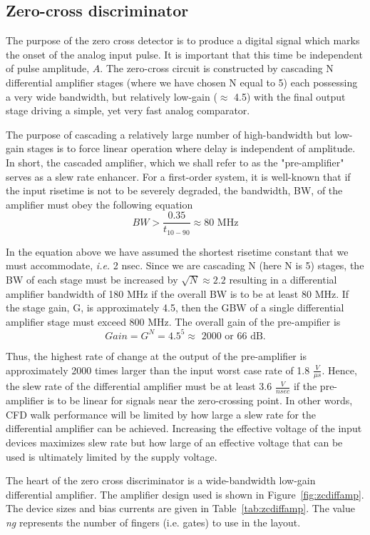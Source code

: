 \documentclass[12pt,oneside,final]{siuethesis}
\theoremstyle{definition}
\begin{document}
\subsection{Zero-cross discriminator}
\par The purpose of the zero cross detector is to produce a digital signal which marks the onset of the analog input pulse. It is important that this time be independent of pulse amplitude, $A$.  The zero-cross circuit is constructed by cascading N differential amplifier stages (where we have chosen N equal to 5) each possessing a very wide bandwidth, but relatively low-gain ($\approx$ 4.5) with the final output stage driving a simple, yet very fast analog comparator.
\par The purpose of cascading a relatively large number of high-bandwidth but low-gain stages is to force linear operation where delay is independent of amplitude. In short, the cascaded amplifier, which we shall refer to as the "pre-amplifier" serves as a slew rate enhancer.  For a first-order system, it is well-known that if the input risetime is not to be severely degraded, the bandwidth, BW, of the amplifier must obey the following equation
\begin{equation}
BW > \frac{0.35}{t_{10-90}} \approx \text{80 MHz}
\end{equation}
\par In the equation above we have assumed the shortest risetime constant that we must accommodate, \emph{i.e.}  2 nsec. Since we are cascading N (here N is 5) stages, the BW of each stage must be increased by $\sqrt{N} \approx 2.2$ resulting in a differential amplifier bandwidth of 180 MHz if the overall BW is to be at least 80 MHz.  If the stage gain, G, is approximately 4.5, then the GBW of a single differential amplifier stage must exceed 800 MHz. The overall gain of the pre-ampifier is
\begin{equation}
Gain = G^N = 4.5^5 \approx \text{ 2000 or 66 dB}.
\end{equation}
\par Thus, the highest rate of change at the output of the pre-amplifier is approximately 2000 times larger than the input worst case rate of 1.8 $\frac{V}{\mu s}$.  Hence, the slew rate of the differential amplifier must be at least 3.6 $\frac{V}{nsec}$ if the pre-amplifier is to be linear for signals near the zero-crossing point. In other words, CFD walk performance will be limited by how large a slew rate for the differential amplifier can be achieved. Increasing the effective voltage of the input devices maximizes slew rate but how large of an effective voltage that can be used is ultimately limited by the supply voltage.
\par The heart of the zero cross discriminator is a wide-bandwidth low-gain differential amplifier. The amplifier design used is shown in Figure~\ref{fig:zcdiffamp}. The device sizes and bias currents are given in Table~\ref{tab:zcdiffamp}. The value \emph{ng} represents the number of fingers (i.e. gates) to use in the layout.
\end{document}

